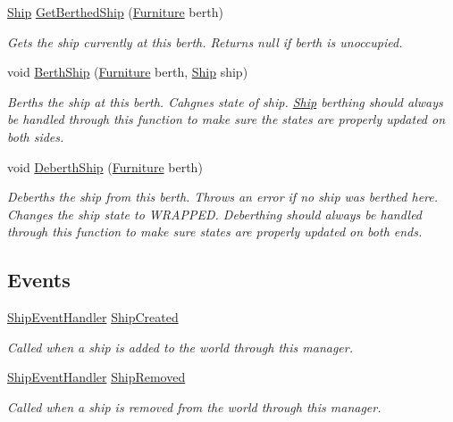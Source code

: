 \begin{DoxyCompactItemize}
\hyperlink{class_ship}{Ship} \hyperlink{class_ship_manager_a105f42a557a914a51310cf37be5624d9}{Get\+Berthed\+Ship} (\hyperlink{class_furniture}{Furniture} berth)
\begin{DoxyCompactList}\small\item\em Gets the ship currently at this berth. Returns null if berth is unoccupied. \end{DoxyCompactList}\item 
void \hyperlink{class_ship_manager_a681b9593e655583c8b0742f80daf5c96}{Berth\+Ship} (\hyperlink{class_furniture}{Furniture} berth, \hyperlink{class_ship}{Ship} ship)
\begin{DoxyCompactList}\small\item\em Berths the ship at this berth. Cahgnes state of ship. \hyperlink{class_ship}{Ship} berthing should always be handled through this function to make sure the states are properly updated on both sides. \end{DoxyCompactList}\item 
void \hyperlink{class_ship_manager_ad53a071f1e61d3542f7a95e1e5a6d783}{Deberth\+Ship} (\hyperlink{class_furniture}{Furniture} berth)
\begin{DoxyCompactList}\small\item\em Deberths the ship from this berth. Throws an error if no ship was berthed here. Changes the ship state to W\+R\+A\+P\+P\+ED. Deberthing should always be handled through this function to make sure states are properly updated on both ends. \end{DoxyCompactList}\end{DoxyCompactItemize}
\subsection*{Events}
\begin{DoxyCompactItemize}
\item 
\hyperlink{class_ship_manager_a9dbbc387497ab2f4fc7c90cde65dfd4d}{Ship\+Event\+Handler} \hyperlink{class_ship_manager_ac4c4c3e36457dd80806ca4c08820852c}{Ship\+Created}
\begin{DoxyCompactList}\small\item\em Called when a ship is added to the world through this manager. \end{DoxyCompactList}\item 
\hyperlink{class_ship_manager_a9dbbc387497ab2f4fc7c90cde65dfd4d}{Ship\+Event\+Handler} \hyperlink{class_ship_manager_a896ffeb71731c612b9da2dc9ffdcdae7}{Ship\+Removed}
\begin{DoxyCompactList}\small\item\em Called when a ship is removed from the world through this manager. \end{DoxyCompactList}\end{DoxyCompactItemize}



